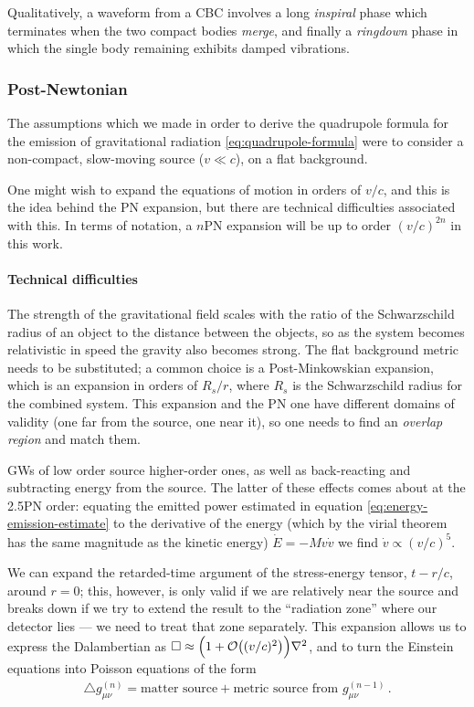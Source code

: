 \documentclass[main.tex]{subfiles}
\begin{document}
Qualitatively, a waveform from a \ac{CBC} involves a long \emph{inspiral} phase which terminates when the two compact bodies \emph{merge}, and finally a \emph{ringdown} phase in which the single body remaining exhibits damped vibrations.

\subsubsection{Post-Newtonian} \label{sec:post-newtonian}

The assumptions which we made in order to derive the quadrupole formula for the emission of gravitational radiation \eqref{eq:quadrupole-formula} were to consider a non-compact, slow-moving source (\(v \ll c\)), on a flat background. 

One might wish to expand the equations of motion in orders of \(v / c\), and this is the idea behind the \ac{PN} expansion, but there are technical difficulties associated with this. 
In terms of notation, a \(n\)PN expansion will be up to order \((v/c)^{2n}\) in this work.

\paragraph{Technical difficulties}

The strength of the gravitational field scales with the ratio of the Schwarzschild radius of an object to the distance between the objects, so as the system becomes relativistic in speed the gravity also becomes strong. 
The flat background metric needs to be substituted; a common choice is a Post-Minkowskian expansion, which is an expansion in orders of \(R_s / r\), where \(R_s\) is the Schwarzschild radius for the combined system. 
This expansion and the \ac{PN} one have different domains of validity (one far from the source, one near it), so one needs to find an \emph{overlap region} and match them.  

\acsp{GW} of low order source higher-order ones, as well as back-reacting and subtracting energy from the source. 
The latter of these effects comes about at the 2.5PN order: equating the emitted power estimated in equation \eqref{eq:energy-emission-estimate} to the derivative of the energy (which by the virial theorem has the same magnitude as the kinetic energy) \(\dot{E} = - M v \dot{v}\) we find  \(\dot{v} \propto (v/c)^{5}\). 

We can expand the retarded-time argument of the stress-energy tensor, \(t - r/c\), around \(r = 0\); this, however, is only valid if we are relatively near the source and breaks down if we try to extend the result to the ``radiation zone'' where our detector lies --- we need to treat that zone separately. 
This expansion allows us to express the Dalambertian as \(\square \approx \qty(1 + \order{(v/c)^2}) \nabla^2\), and to turn the Einstein equations into Poisson equations of the form 
%
\begin{align}
\triangle g_{\mu \nu }^{(n)} = \text{matter source} + \text{metric source from \(g_{\mu \nu}^{(n-1)}\)}
\,.
\end{align}
\end{document}
